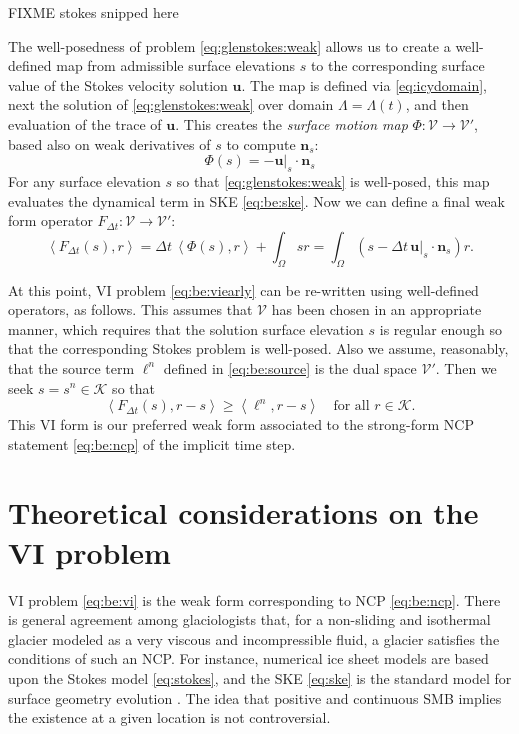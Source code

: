 \documentclass[hidelinks,onefignum,onetabnum,final]{siamart220329}  %
\newcommand{\bn}{\mathbf{n}}
\newcommand{\bu}{\mathbf{u}}
\newcommand{\cK}{\mathcal{K}}
\newcommand{\cV}{\mathcal{V}}
\newcommand{\ip}[2]{\left<#1,#2\right>}
\begin{document}
FIXME stokes snipped here

The well-posedness of problem \eqref{eq:glenstokes:weak} allows us to create a well-defined map from admissible surface elevations $s$ to the corresponding surface value of the Stokes velocity solution $\bu$.  The map is defined via \eqref{eq:icydomain}, next the solution of \eqref{eq:glenstokes:weak} over domain $\Lambda=\Lambda(t)$, and then evaluation of the trace of $\bu$.  This creates the \emph{surface motion map} $\Phi:\cV \to \cV'$, based also on weak derivatives of $s$ to compute $\bn_s$:
\begin{equation}
\Phi(s) = - \bu|_s\cdot \bn_s \label{eq:be:Phidefine}
\end{equation}
For any surface elevation $s$ so that \eqref{eq:glenstokes:weak} is well-posed, this map evaluates the dynamical term in SKE \eqref{eq:be:ske}.  Now we can define a final weak form operator $F_{\Delta t}:\cV\to\cV'$:
\begin{equation}
\ip{F_{\Delta t}(s)}{r} = \Delta t\,\ip{\Phi(s)}{r} + \int_\Omega s r = \int_\Omega \left(s - \Delta t\, \bu|_s \cdot \bn_s\right) r.  \label{eq:be:Fdefine}
\end{equation}

At this point, VI problem \eqref{eq:be:viearly} can be re-written using well-defined operators, as follows.  This assumes that $\cV$ has been chosen in an appropriate manner, which requires that the solution surface elevation $s$ is regular enough so that the corresponding Stokes problem is well-posed.  Also we assume, reasonably, that the source term $\ell^n$ defined in \eqref{eq:be:source} is the dual space $\cV'$.  Then we seek $s = s^n \in \cK$ so that
\begin{equation}
\ip{F_{\Delta t}(s)}{r-s} \ge \ip{\ell^n}{r-s} \quad \text{for all } r \in \cK. \label{eq:be:vi}
\end{equation}
This VI form is our preferred weak form associated to the strong-form NCP statement \eqref{eq:be:ncp} of the implicit time step.


\section{Theoretical considerations on the VI problem} \label{sec:theory}

VI problem \eqref{eq:be:vi} is the weak form corresponding to NCP \eqref{eq:be:ncp}.  There is general agreement among glaciologists that, for a non-sliding and isothermal glacier modeled as a very viscous and incompressible fluid, a glacier satisfies the conditions of such an NCP.  For instance, numerical ice sheet models \cite{IsaacStadlerGhattas2015,WirbelJarosch2020} are based upon the Stokes model \eqref{eq:stokes}, and the SKE \eqref{eq:ske} is the standard model for surface geometry evolution \cite{GreveBlatter2009,SchoofHewitt2013}.  The idea that positive and continuous SMB implies the existence at a given location is not controversial.
\end{document}

